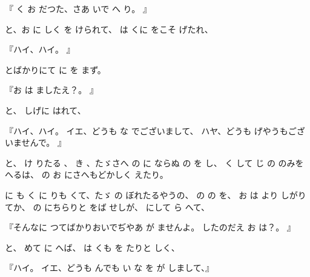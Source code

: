 
『
く
お
だつた、さあ
いで
へ
り。
』

と、お
に
しく
を
けられて、
は
くに
をこそ
げたれ、

『ハイ、ハイ。
』

とばかりにて
に
を
まず。

『お
は
ましたえ？。
』

と、
しげに
はれて、

『ハイ、ハイ。
イエ、どうも
な
でございまして、
ハヤ、どうも
げやうもございませんで。
』

と、
け
りたる
、
き
、たゞさへ
の
に
ならぬ
の
を
し、
く
して
じ
の
のみを
へるは、
の
お
にさへもどかしく
えたり。

に
も
く
に
りも
くて、たゞ
の
ぼれたるやうの、
の
の
を、
お
は
より
しがりてか、
の
にちらりと
をば
せしが、
にして
ら
へて、

『そんなに
つてばかりおいでぢやあ
が
ませんよ。
したのだえ
お
は？。
』

と、
めて
に
へば、
は
くも
を
たりと
しく、

『ハイ。
イエ、どうも
んでも
い
な
を
が
しまして、』

